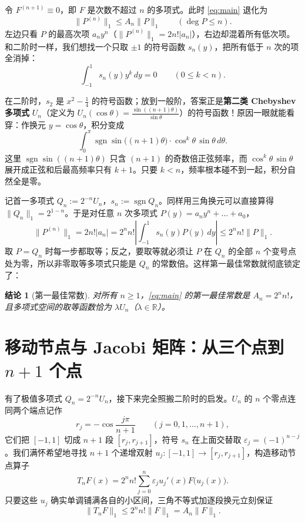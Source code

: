 \documentclass[UTF8,fontset=windows,a4paper,11pt]{ctexart}
\newcommand{\R}{\mathbb{R}}
\newcommand{\sgn}{\operatorname{sgn}}
\newcommand{\Lone}[1]{\lVert #1\rVert_1}
\newtheorem{claim}{结论}
\begin{document}
令 $F^{(n+1)}\equiv 0$，即 $F$ 是次数不超过 $n$ 的多项式。此时 \eqref{eq:main} 退化为
\[
    \Lone{P^{(n)}}\le A_n\Lone{P}\qquad (\deg P\le n).
\]
左边只看 $P$ 的最高次项 $a_n y^n$（$\Lone{P^{(n)}}=2n!|a_n|$），右边却混着所有低次项。和二阶时一样，我们想找一个只取 $\pm 1$ 的符号函数 $s_n(y)$，把所有低于 $n$ 次的项全消掉：
\[
    \int_{-1}^{1} s_n(y)y^k\,dy = 0 \qquad (0\le k<n).
\]

在二阶时，$s_2$ 是 $x^2-\frac14$ 的符号函数；放到一般阶，答案正是\textbf{第二类 Chebyshev 多项式} $U_n$（定义为 $U_n(\cos\theta)=\frac{\sin((n+1)\theta)}{\sin\theta}$）的符号函数！原因一眼就能看穿：作换元 $y=\cos\theta$，积分变成
\[
    \int_0^\pi \sgn\sin\bigl((n+1)\theta\bigr)\cdot \cos^k\theta\,\sin\theta\,d\theta.
\]
这里 $\sgn\sin((n+1)\theta)$ 只含 $(n+1)$ 的奇数倍正弦频率，而 $\cos^k\theta\,\sin\theta$ 展开成正弦和后最高频率只有 $k+1$。只要 $k<n$，频率根本碰不到一起，积分自然全是零。

记首一多项式 $Q_n:=2^{-n}U_n$，$s_n:=\sgn Q_n$。同样用三角换元可以直接算得 $\Lone{Q_n}=2^{1-n}$。于是对任意 $n$ 次多项式 $P(y)=a_n y^n+\dots+a_0$，
\[
    \Lone{P^{(n)}} = 2n!|a_n| = 2^n n!\left|\int_{-1}^{1}s_n(y)P(y)\,dy\right|
    \le 2^n n!\Lone{P}.
\]
取 $P=Q_n$ 时每一步都取等；反之，要取等就必须让 $P$ 在 $Q_n$ 的全部 $n$ 个变号点处为零，所以非零取等多项式只能是 $Q_n$ 的常数倍。这样第一最佳常数就彻底锁定了：

\begin{claim}[第一最佳常数]
    \label{clm:An}
    对所有 $n\ge 1$，\eqref{eq:main} 的第一最佳常数是 $A_n=2^n n!$，且多项式空间的取等函数恰为 $\lambda U_n$（$\lambda\in\R$）。
\end{claim}

\section{移动节点与 Jacobi 矩阵：从三个点到 $n+1$ 个点}
\label{sec:matrix}

有了极值多项式 $Q_n=2^{-n}U_n$，接下来完全照搬二阶时的启发。$U_n$ 的 $n$ 个零点连同两个端点记作
\[
    r_j = -\cos\frac{j\pi}{n+1}\qquad (j=0,1,\dots,n+1),
\]
它们把 $[-1,1]$ 切成 $n+1$ 段 $[r_j,r_{j+1}]$，符号 $s_n$ 在上面交替取 $\varepsilon_j=(-1)^{n-j}$。我们满怀希望地寻找 $n+1$ 个递增双射 $u_j:[-1,1]\to[r_j,r_{j+1}]$，构造移动节点算子
\begin{equation}
    T_n F(x) = 2^n n!\sum_{j=0}^{n}\varepsilon_j u_j'(x)F\bigl(u_j(x)\bigr).
    \label{eq:Tn}
\end{equation}
只要这些 $u_j$ 确实单调铺满各自的小区间，三角不等式加逐段换元立刻保证
\begin{equation}
    \Lone{T_n F} \le 2^n n!\Lone{F} = A_n\Lone{F}.
    \label{eq:Tn-bound}
\end{equation}
\end{document}
